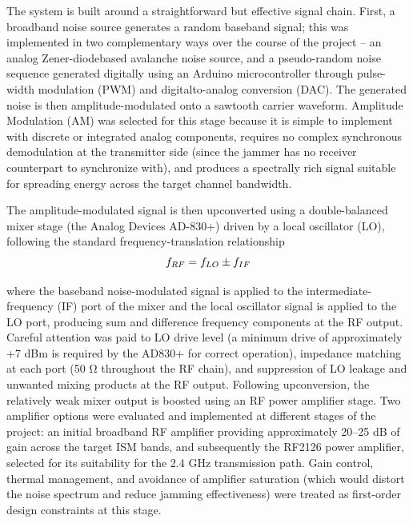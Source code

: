\documentclass[12pt,a4paper]{report}
\begin{document}
	The system is built around a straightforward but effective signal chain. First, a broadband noise source generates a random baseband signal; this was implemented in two complementary ways over the course of the project – an analog Zener-diodebased avalanche noise source, and a pseudo-random noise sequence generated digitally using an Arduino microcontroller through pulse-width modulation (PWM) and digitalto-analog conversion (DAC). The generated noise is then amplitude-modulated onto a sawtooth carrier waveform. Amplitude Modulation (AM) was selected for this stage because it is simple to implement with discrete or integrated analog components, requires no complex synchronous demodulation at the transmitter side (since the jammer has no receiver counterpart to synchronize with), and produces a spectrally rich signal suitable for spreading energy across the target channel bandwidth.
	\vspace{0.5cm}
	
	The amplitude-modulated signal is then upconverted using a double-balanced mixer stage (the Analog Devices AD-830+) driven by a local oscillator (LO), following the standard frequency-translation relationship
	\begingroup
	\setlength{\mathindent}{0pt}
	\begin{equation*}
		\hfill
		f_{RF}=f_{LO}\pm f_{IF}
		\hfill
	\end{equation*}
	\endgroup
	
	where the baseband noise-modulated signal is applied to the intermediate-frequency (IF) port of the mixer and the local oscillator signal is applied to the LO port, producing sum and difference frequency components at the RF output. Careful attention was paid to LO drive level (a minimum drive of approximately +7 dBm is required by the AD830+ for correct operation), impedance matching at each port (50 Ω throughout the RF chain), and suppression of LO leakage and unwanted mixing products at the RF output.
	Following upconversion, the relatively weak mixer output is boosted using an RF power amplifier stage. Two amplifier options were evaluated and implemented at different stages of the project: an initial broadband RF amplifier providing approximately 20–25 dB of gain across the target ISM bands, and subsequently the RF2126 power amplifier, selected for its suitability for the 2.4 GHz transmission path. Gain control, thermal management, and avoidance of amplifier saturation (which would distort the noise spectrum and reduce jamming effectiveness) were treated as first-order design constraints at this stage.
	
\end{document}
